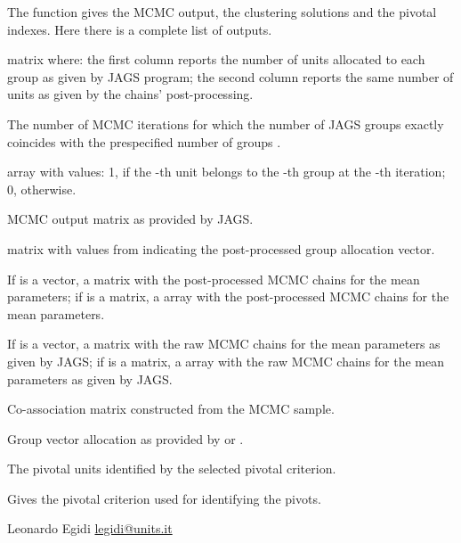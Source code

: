 \documentclass[a4paper]{book}
\begin{document}
\begin{Value}
The function gives the MCMC output, the clustering
solutions and the pivotal indexes. Here there is a complete list of outputs.

\begin{ldescription}
\item[\code{\code{Freq}}]    matrix where: the first column
reports the number of units allocated to each group
as given by JAGS program; the second
column reports the same number of units as given by the
chains' post-processing.
\item[\code{\code{true.iter}}]  The number of MCMC iterations for which
the number of JAGS groups exactly coincides with the prespecified
number of groups .
\item[\code{\code{z} }]    array with values: 1,
if the -th unit belongs to the -th group at
the -th iteration; 0, otherwise.
\item[\code{\code{ris}}]   MCMC output matrix as provided by JAGS.
\item[\code{\code{groupPost}}]   matrix
with values from  indicating the post-processed group allocation
vector.
\item[\code{\code{mu\_switch}}]   If  is a vector, a 
matrix with the post-processed MCMC chains for the mean parameters; if
 is a matrix, a  array with
the post-processed MCMC chains for the mean parameters.
\item[\code{\code{mu\_raw}}]  If  is a vector, a  matrix
with the raw MCMC chains for the mean parameters as given by JAGS; if
 is a matrix, a  array with the raw MCMC chains
for the mean parameters as given by JAGS.
\item[\code{\code{C}}] Co-association matrix constructed from the MCMC sample.
\item[\code{\code{grr}}] Group vector allocation as provided by
 or .
\item[\code{\code{pivots}}]  The pivotal units identified by the
selected pivotal criterion.
\item[\code{\code{piv.criterion}}]  Gives the pivotal criterion used for identifying
the pivots.
\end{ldescription}
\end{Value}
%
\begin{Author}\relax
Leonardo Egidi \url{legidi@units.it}
\end{Author}
\end{document}
